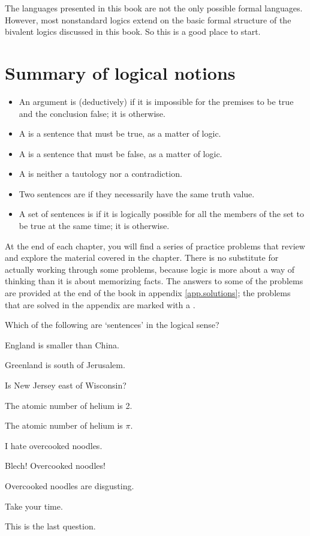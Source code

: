 The languages presented in this book are not the only possible formal languages. However, most nonstandard logics extend on the basic formal structure of the bivalent logics discussed in this book. So this is a good place to start.


\section*{Summary of logical notions}
\begin{itemize}
\item An argument is (deductively)  if it is impossible for the premises to be true and the conclusion false; it is  otherwise.

\item A  is a sentence that must be true, as a matter of logic.

\item A  is a sentence that must be false, as a matter of logic.

\item A  is neither a tautology nor a contradiction.

\item Two sentences are  if they necessarily have the same truth value.

\item A set of sentences is  if it is logically possible for all the members of the set to be true at the same time; it is  otherwise.
\end{itemize}



\practiceproblems
At the end of each chapter, you will find a series of practice problems that review and explore the material covered in the chapter. There is no substitute for actually working through some problems, because logic is more about a way of thinking than it is about memorizing facts. The answers to some of the problems are provided at the end of the book in appendix \ref{app.solutions}; the problems that are solved in the appendix are marked with a \solutions.

\problempart
Which of the following are `sentences' in the logical sense?
\begin{earg}
\item England is smaller than China.
\item Greenland is south of Jerusalem.
\item Is New Jersey east of Wisconsin?
\item The atomic number of helium is 2.
\item The atomic number of helium is $\pi$.
\item I hate overcooked noodles.
\item Blech! Overcooked noodles!
\item Overcooked noodles are disgusting.
\item Take your time.
\item This is the last question.
\end{earg}


